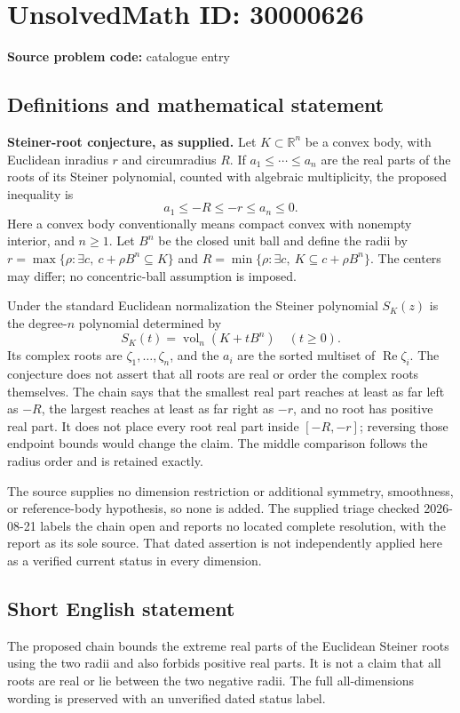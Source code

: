 \documentclass[11pt]{article}
\newcommand{\R}{\mathbb{R}}
\begin{document}
\section*{UnsolvedMath ID: 30000626}
\textbf{Source problem code:} catalogue entry
\subsection{Definitions and mathematical statement}
\textbf{Steiner-root conjecture, as supplied.} Let \(K\subset\R^n\) be a convex body, with Euclidean inradius \(r\) and circumradius \(R\). If \(a_1\le\cdots\le a_n\) are the real parts of the roots of its Steiner polynomial, counted with algebraic multiplicity, the proposed inequality is\[a_1\le-R\le-r\le a_n\le0.\] Here a convex body conventionally means compact convex with nonempty interior, and \(n\ge1\). Let \(B^n\) be the closed unit ball and define the radii by \(r=\max\{\rho:\exists c,\ c+\rho B^n\subseteq K\}\) and \(R=\min\{\rho:\exists c,\ K\subseteq c+\rho B^n\}\). The centers may differ; no concentric-ball assumption is imposed.\par Under the standard Euclidean normalization the Steiner polynomial \(S_K(z)\) is the degree-\(n\) polynomial determined by\[S_K(t)=\operatorname{vol}_n(K+tB^n)\quad(t\ge0).\] Its complex roots are \(\zeta_1,\ldots,\zeta_n\), and the \(a_i\) are the sorted multiset of \(\operatorname{Re}\zeta_i\). The conjecture does not assert that all roots are real or order the complex roots themselves. The chain says that the smallest real part reaches at least as far left as \(-R\), the largest reaches at least as far right as \(-r\), and no root has positive real part. It does not place every root real part inside \([-R,-r]\); reversing those endpoint bounds would change the claim. The middle comparison follows the radius order and is retained exactly.\par The source supplies no dimension restriction or additional symmetry, smoothness, or reference-body hypothesis, so none is added. The supplied triage checked 2026-08-21 labels the chain open and reports no located complete resolution, with the report as its sole source. That dated assertion is not independently applied here as a verified current status in every dimension.
\subsection{Short English statement}
The proposed chain bounds the extreme real parts of the Euclidean Steiner roots using the two radii and also forbids positive real parts. It is not a claim that all roots are real or lie between the two negative radii. The full all-dimensions wording is preserved with an unverified dated status label.
\end{document}
